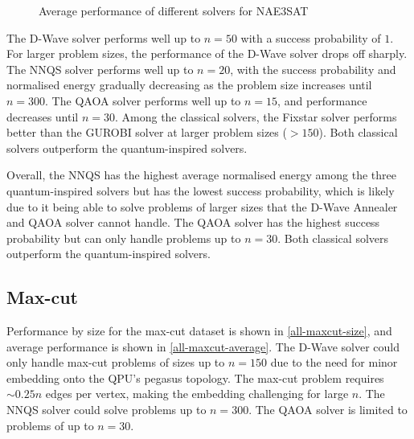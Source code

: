\begin{figure}[!htb]
    \centering
    \hspace{30px}
    \caption{Average performance of different solvers for NAE3SAT}
    \label{all-nae3sat-average}
\end{figure}

The D-Wave solver performs well up to $n=50$ with a success probability of $1$. For larger problem sizes, the performance of the D-Wave solver drops off sharply. The NNQS solver performs well up to $n=20$, with the success probability and normalised energy gradually decreasing as the problem size increases until $n=300$. The QAOA solver performs well up to $n=15$, and performance decreases until $n=30$. Among the classical solvers, the Fixstar solver performs better than the GUROBI solver at larger problem sizes ($>150$). Both classical solvers outperform the quantum-inspired solvers.

Overall, the NNQS has the highest average normalised energy among the three quantum-inspired solvers but has the lowest success probability, which is likely due to it being able to solve problems of larger sizes that the D-Wave Annealer and QAOA solver cannot handle. The QAOA solver has the highest success probability but can only handle problems up to $n=30$. Both classical solvers outperform the quantum-inspired solvers.

\subsection{Max-cut}
Performance by size for the max-cut dataset is shown in \autoref{all-maxcut-size}, and average performance is shown in \autoref{all-maxcut-average}. The D-Wave solver could only handle max-cut problems of sizes up to $n=150$ due to the need for minor embedding onto the QPU's pegasus topology. The max-cut problem requires $\sim 0.25n$ edges per vertex, making the embedding challenging for large $n$. The NNQS solver could solve problems up to $n=300$. The QAOA solver is limited to problems of up to $n=30$.

